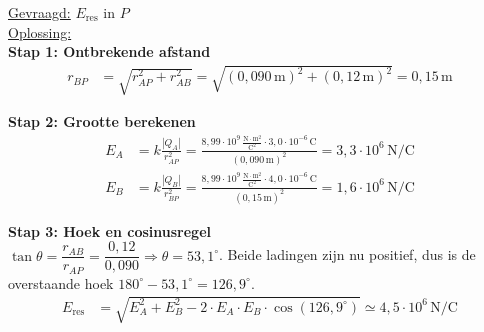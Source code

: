 \documentclass{ximera}
\begin{document}
\begin{exercise}
\begin{solution}
        \underline{Gevraagd:} $E_{\text{res}}$ in $P$\\

        \underline{Oplossing:}\\
        \textbf{Stap 1: Ontbrekende afstand}
        \begin{align*}
            r_{BP} &= \sqrt{r_{AP}^{2} + r_{AB}^{2}} = \sqrt{(0{,}090 \, \mathrm{m})^{2} + (0{,}12 \, \mathrm{m})^{2}} = 0{,}15 \, \mathrm{m}
        \end{align*}

        \textbf{Stap 2: Grootte berekenen}
        \begin{align*}
            E_{A} &= k \frac{|Q_{A}|}{r_{AP}^{2}} = \frac{8{,}99 \cdot 10^{9} \, \mathrm{\frac{N \cdot m^2}{C^2}} \cdot 3{,}0 \cdot 10^{-6} \, \mathrm{C}}{(0{,}090 \, \mathrm{m})^{2}} = 3{,}3 \cdot 10^{6} \, \mathrm{N/C} \\
            E_{B} &= k \frac{|Q_{B}|}{r_{BP}^{2}} = \frac{8{,}99 \cdot 10^{9} \, \mathrm{\frac{N \cdot m^2}{C^2}} \cdot 4{,}0 \cdot 10^{-6} \, \mathrm{C}}{(0{,}15 \, \mathrm{m})^{2}} = 1{,}6 \cdot 10^{6} \, \mathrm{N/C}
        \end{align*}

        \textbf{Stap 3: Hoek en cosinusregel}\\
        $\tan\theta = \dfrac{r_{AB}}{r_{AP}} = \dfrac{0{,}12}{0{,}090} \Rightarrow \theta = 53{,}1^\circ$. Beide ladingen zijn nu positief, dus is de overstaande hoek $180^\circ - 53{,}1^\circ = 126{,}9^\circ$.
        \begin{align*}
            E_{\text{res}} &= \sqrt{E_A^{2} + E_B^{2} - 2 \cdot E_A \cdot E_B \cdot \cos(126{,}9^\circ)} \simeq \boxed{4{,}5 \cdot 10^{6} \, \mathrm{N/C}}
        \end{align*}
    \end{solution}
\end{exercise}
\end{document}
